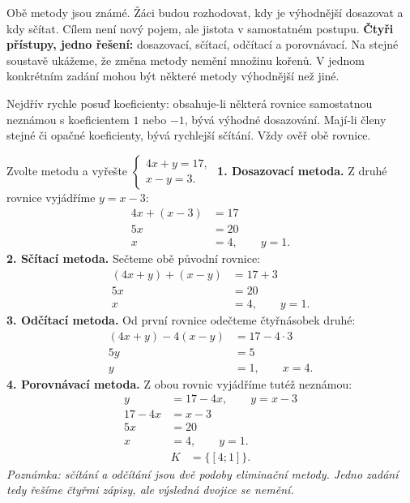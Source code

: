 \documentclass[11pt,a4paper]{article}
\begin{document}
Obě metody jsou známé. Žáci budou rozhodovat, kdy je výhodnější dosazovat a kdy sčítat. Cílem není nový pojem, ale jistota v samostatném postupu.
\textbf{Čtyři přístupy, jedno řešení:} dosazovací, sčítací, odčítací a porovnávací. Na stejné soustavě ukážeme, že změna metody nemění množinu kořenů. V jednom konkrétním zadání mohou být některé metody výhodnější než jiné.

Nejdřív rychle posuď koeficienty: obsahuje-li některá rovnice samostatnou neznámou s koeficientem $1$ nebo $-1$, bývá výhodné dosazování. Mají-li členy stejné či opačné koeficienty, bývá rychlejší sčítání. Vždy ověř obě rovnice.
\begin{prikladReseniBox}[title={Příklad 1}]
Zvolte metodu a vyřešte $\begin{cases}4x+y=17,\\x-y=3.\end{cases}$
\tcblower
\textbf{1. Dosazovací metoda.} Z druhé rovnice vyjádříme $y=x-3$:
\[\begin{aligned}
4x+(x-3)&=17\\
5x&=20\\
x&=4,\qquad y=1.
\end{aligned}\]
\textbf{2. Sčítací metoda.} Sečteme obě původní rovnice:
\[\begin{aligned}
(4x+y)+(x-y)&=17+3\\
5x&=20\\
x&=4,\qquad y=1.
\end{aligned}\]
\textbf{3. Odčítací metoda.} Od první rovnice odečteme čtyřnásobek druhé:
\[\begin{aligned}
(4x+y)-4(x-y)&=17-4\cdot3\\
5y&=5\\
y&=1,\qquad x=4.
\end{aligned}\]
\textbf{4. Porovnávací metoda.} Z obou rovnic vyjádříme tutéž neznámou:
\[\begin{aligned}
y&=17-4x,\qquad y=x-3\\
17-4x&=x-3\\
5x&=20\\
x&=4,\qquad y=1.
\end{aligned}\]
\[\begin{aligned}
K&=\{[4;1]\}.
\end{aligned}\]
\textit{Poznámka: sčítání a odčítání jsou dvě podoby eliminační metody. Jedno zadání tedy řešíme čtyřmi zápisy, ale výsledná dvojice se nemění.}
\end{prikladReseniBox}
\end{document}
